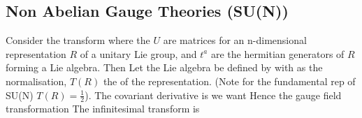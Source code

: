 \documentclass{article}
\begin{document}
\subsection{Non Abelian Gauge Theories (SU(N))}
Consider the transform 
where the $U$ are matrices for an n-dimensional representation $R$ of a unitary Lie group, and $t^a$ are the hermitian generators of $R$ forming a Lie algebra. Then 
Let the Lie algebra be defined by 
with 
as the normalisation, $T(R)$ the  of the representation. (Note for the fundamental rep of SU(N) $T(R)=\frac{1}{2}$). The covariant derivative is 
we want 
Hence the gauge field transformation 
The infinitesimal transform is 
\end{document}
